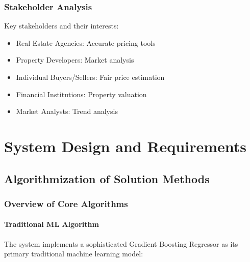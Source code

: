 \documentclass[12pt,a4paper]{report}
\begin{document}
\subsection{Stakeholder Analysis}
Key stakeholders and their interests:
\begin{itemize}
    \item Real Estate Agencies: Accurate pricing tools
    \item Property Developers: Market analysis
    \item Individual Buyers/Sellers: Fair price estimation
    \item Financial Institutions: Property valuation
    \item Market Analysts: Trend analysis
\end{itemize}

\chapter{System Design and Requirements}
\section{Algorithmization of Solution Methods}
\subsection{Overview of Core Algorithms}

\subsubsection{Traditional ML Algorithm}
The system implements a sophisticated Gradient Boosting Regressor as its primary traditional machine learning model:
\end{document}

